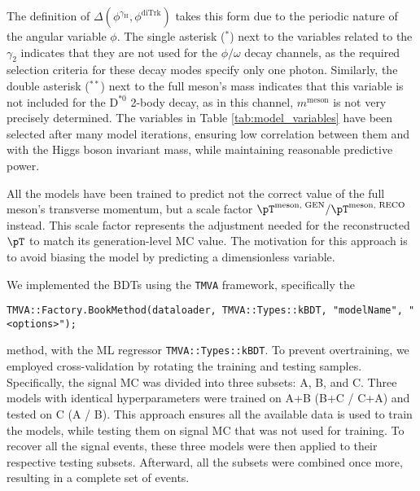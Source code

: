 The definition of $\Delta(\phi^{\gamma_{\text{H}}}, \phi^{\text{diTrk}})$ takes this form due to the periodic nature of the angular variable $\phi$. The single asterisk ($^{*}$) next to the variables related to the $\gamma_2$ indicates that they are not used for the $\phi/\omega$ decay channels, as the required selection criteria for these decay modes specify only one photon. Similarly, the double asterisk ($^{**}$) next to the full meson's mass indicates that this variable is not included for the $\text{D}^{*0}$ 2-body decay, as in this channel, $m^{\text{meson}}$ is not very precisely determined. The variables in Table \ref{tab:model_variables} have been selected after many model iterations, ensuring low correlation between them and with the Higgs boson invariant mass, while maintaining reasonable predictive power.

All the models have been trained to predict not the correct value of the full meson's transverse momentum, but a scale factor $\pT^{\text{meson, GEN}}/\pT^{\text{meson, RECO}}$ instead. This scale factor represents the adjustment needed for the reconstructed $\pT$ to match its generation-level MC value. The motivation for this approach is to avoid biasing the model by predicting a dimensionless variable.

We implemented the BDTs using the \verb+TMVA+ framework, specifically the
\begin{small}
\vspace*{-6pt}
\begin{verbatim}
TMVA::Factory.BookMethod(dataloader, TMVA::Types::kBDT, "modelName", "<options>");
\end{verbatim}
\vspace*{-6pt}
\end{small}
method, with the ML regressor \verb+TMVA::Types::kBDT+. To prevent overtraining, we employed cross-validation by rotating the training and testing samples. Specifically, the signal MC was divided into three subsets: A, B, and C. Three models with identical hyperparameters were trained on A+B (B+C / C+A) and tested on C (A / B). This approach ensures all the available data is used to train the models, while testing them on signal MC that was not used for training. To recover all the signal events, these three models were then applied to their respective testing subsets. Afterward, all the subsets were combined once more, resulting in a complete set of events.

